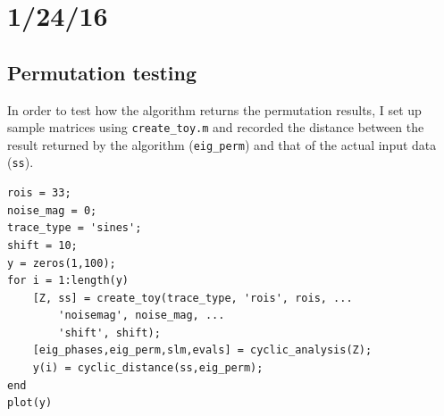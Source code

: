 \documentclass[11pt]{article}
\begin{document}
\section{1/24/16}
\subsection{Permutation testing}
In order to test how the algorithm returns the permutation results, I set up sample matrices using \verb|create_toy.m| and recorded the distance between the result returned by the algorithm (\verb|eig_perm|) and that of the actual input data (\verb|ss|).

\lstset{language=Matlab, caption=Compare Permutations}
\begin{lstlisting}[frame=single]
rois = 33;
noise_mag = 0;
trace_type = 'sines';
shift = 10;
y = zeros(1,100);
for i = 1:length(y)
	[Z, ss] = create_toy(trace_type, 'rois', rois, ...
		'noisemag', noise_mag, ...
		'shift', shift);
	[eig_phases,eig_perm,slm,evals] = cyclic_analysis(Z);
	y(i) = cyclic_distance(ss,eig_perm);
end
plot(y)
\end{lstlisting}
\end{document}
